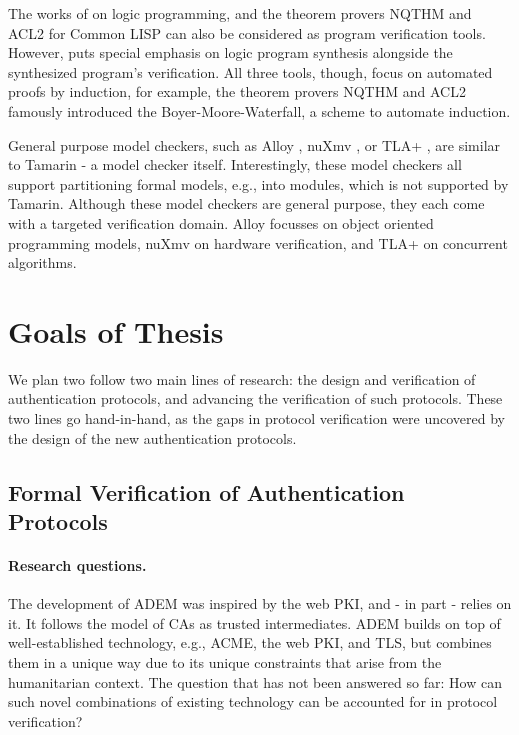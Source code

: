 \documentclass{article}
\begin{document}
The works of \citeauthor{ThesisInaKraan} \cite{ThesisInaKraan} on logic programming, and the theorem provers NQTHM \cite{NQTHM} and ACL2 \cite{ACL2} for Common LISP can also be considered as program verification tools.
However, \citeauthor{ThesisInaKraan} \cite{ThesisInaKraan} puts special emphasis on logic program synthesis alongside the synthesized program's verification.
All three tools, though, focus on automated proofs by induction, for example, the theorem provers NQTHM and ACL2 famously introduced the Boyer-Moore-Waterfall, a scheme to automate induction.

General purpose model checkers, such as Alloy \cite{AlloyBook}, nuXmv \cite{nuXmv}, or TLA+ \cite{TLAPlus}, are similar to Tamarin - a model checker itself.
Interestingly, these model checkers all support partitioning formal models, e.g., into modules, which is not supported by Tamarin.
Although these model checkers are general purpose, they each come with a targeted verification domain.
Alloy focusses on object oriented programming models, nuXmv on hardware verification, and TLA+ on concurrent algorithms.

\section{Goals of Thesis}

We plan two follow two main lines of research: the design and verification of authentication protocols, and advancing the verification of such protocols.
These two lines go hand-in-hand, as the gaps in protocol verification were uncovered by the design of the new authentication protocols.

\subsection{Formal Verification of Authentication Protocols}

\paragraph{Research questions.}
The development of \gls{ADEM} was inspired by the web \gls{PKI}, and - in part - relies on it.
It follows the model of \glspl{CA} as trusted intermediates.
\Gls{ADEM} builds on top of well-established technology, e.g., \gls{ACME}, the web \gls{PKI}, and TLS, but combines them in a unique way due to its unique constraints that arise from the humanitarian context.
The question that has not been answered so far: How can such novel combinations of existing technology can be accounted for in protocol verification?
\end{document}
